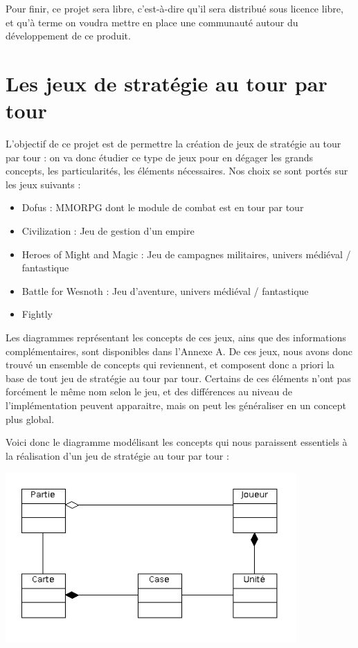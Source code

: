 \documentclass[a4paper,10pt]{report}
\begin{document}
      Pour finir, ce projet sera libre, c'est-à-dire qu'il sera distribué sous licence libre, et qu'à terme on voudra mettre en place une communauté autour du développement de ce produit. 


    \section{Les jeux de stratégie au tour par tour}

      L'objectif de ce projet est de permettre la création de jeux de stratégie au tour par tour : on va donc étudier ce type de jeux pour en dégager les grands concepts, les particularités, les éléments nécessaires. Nos choix se sont portés sur les jeux suivants : 

      \begin{itemize}
        \item Dofus : MMORPG dont le module de combat est en tour par tour
        \item Civilization : Jeu de gestion d'un empire
        \item Heroes of Might and Magic : Jeu de campagnes militaires, univers médiéval / fantastique
        \item Battle for Wesnoth : Jeu d'aventure, univers médiéval / fantastique
        \item Fightly
      \end{itemize}

      Les diagrammes représentant les concepts de ces jeux, ains que des informations complémentaires, sont disponibles dans l'Annexe A. De ces jeux, nous avons donc trouvé un ensemble de concepts qui reviennent, et composent donc a priori la base de tout jeu de stratégie au tour par tour. Certains de ces éléments n'ont pas forcément le même nom selon le jeu, et des différences au niveau de l'implémentation peuvent apparaitre, mais on peut les généraliser en un concept plus global. 

      Voici donc le diagramme modélisant les concepts qui nous paraissent essentiels à la réalisation d'un jeu de stratégie au tour par tour : 
      
      \includegraphics[width=420px]{diagrammes/concept-fightly.png}
      
\end{document}
